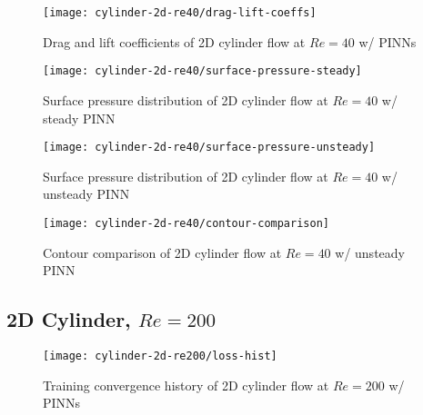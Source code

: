 \begin{figure}[!hbt]
    \centering%
    \texttt{[image: cylinder-2d-re40/drag-lift-coeffs]}%
    \caption{%
        Drag and lift coefficients of 2D cylinder flow at $Re=\num{40}$ w/ PINNs
    }
    \label{fig:cylinder-re40-drag-lift}%
\end{figure}

\lipsum[1]

\begin{figure}[!hbt]
    \centering%
    \texttt{[image: cylinder-2d-re40/surface-pressure-steady]}%
    \caption{%
        Surface pressure distribution of 2D cylinder flow at $Re=\num{40}$ w/ steady PINN
    }
    \label{fig:cylinder-re40-steady-pinn-surfp}%
\end{figure}

\lipsum[1]

\begin{figure}[!hbt]
    \centering%
    \texttt{[image: cylinder-2d-re40/surface-pressure-unsteady]}%
    \caption{%
        Surface pressure distribution of 2D cylinder flow at $Re=\num{40}$ w/ unsteady PINN
    }
    \label{fig:cylinder-re40-unsteady-pinn-surfp}%
\end{figure}

\lipsum[1]

\begin{figure*}[!t]
    \centering%
    \texttt{[image: cylinder-2d-re40/contour-comparison]}%
    \caption{%
        Contour comparison of 2D cylinder flow at $Re=\num{40}$ w/ unsteady PINN
    }
    \label{fig:cylinder-re40-contours}%
\end{figure*}

\lipsum[1]

\subsection{2D Cylinder, $Re=\num{200}$}

\lipsum[1]

\begin{figure}[!hbt]
    \centering%
    \texttt{[image: cylinder-2d-re200/loss-hist]}%
    \caption{%
        Training convergence history of 2D cylinder flow at $Re=\num{200}$ w/ PINNs
    }
    \label{fig:cylinder-re200-pinn-loss}%
\end{figure}

\lipsum[1]

